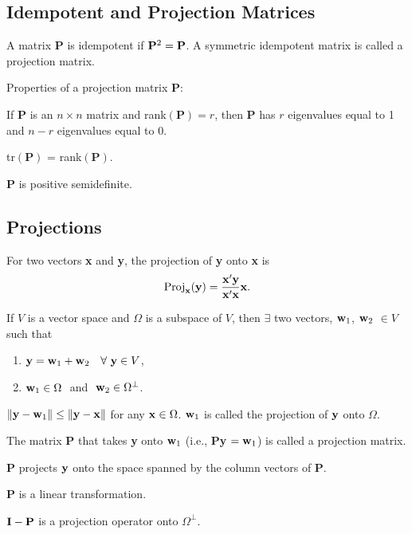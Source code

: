 \subsection{Idempotent and Projection Matrices}

\bdefi
A matrix $\mathbf P$ is idempotent if $\mathbf P^2={\bf P}$.  A
symmetric idempotent matrix is called a projection matrix.
\edefi

Properties of a projection matrix $\mathbf P$:

\bstheo
If $\mathbf P$ is an $n\times n$ matrix and rank$(\mathbf{P})=r$, then
$\mathbf P$ has $r$ eigenvalues equal to 1 and $n-r$ eigenvalues equal
to 0.
\estheo

\bstheo
tr$(\mathbf P)$ = rank$(\mathbf P)$.
\estheo

\bstheo
$\mathbf P$ is positive semidefinite.
\etheo


\subsection{Projections}

\bdefi
For two vectors {\bf x} and {\bf y}, the projection of {\bf y} onto
{\bf x} is
$$ {\rm Proj}_{\bf x}({\bf y}) = {{\bf x}'{\bf y}\over {\bf x}'{\bf
x}} {\bf x}.
$$
\edefi

\bstheo
If $V$ is a vector space and $\Omega$ is a subspace of $V$, then
$\exists$ two vectors, ${\bf w}_1$, ${\bf w}_2$ $\in V$ such that
\begin{enumerate}
\item ${\bf y}= {\bf w}_1 + {\bf w}_2 \quad \forall \ {\bf y}\in V$,
\item ${\bf w}_1 \in \Omega\ $ and $\ {\bf w}_2 \in \Omega^{\perp}$.
\end{enumerate}
\estheo

\bstheo
$\|{\bf y}-{\bf w}_1\| \le \|{\bf y}-{\bf x}\|$ for any ${\bf x}\in
\Omega$.  ${\bf w}_1$ is called the projection of ${\bf y}$ onto
$\Omega$.
\estheo

\bdefi
The matrix {\bf P} that takes {\bf y} onto ${\bf w}_1$ (i.e., {\bf
P}{\bf y} $ = {\bf w}_1$) is called a projection matrix.
\edefi

\bstheo
{\bf P} projects ${\bf y}$ onto the space spanned by the column
vectors of {\bf P}.
\estheo

\bstheo
{\bf P} is a linear transformation.
\estheo

\bstheo
${\bf I}-{\bf P}$ is a projection operator onto $\Omega^{\perp}$.
\estheo


